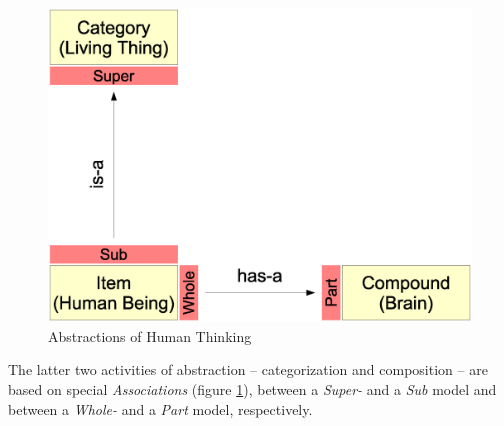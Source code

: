 \begin{figure}[ht]
    \begin{center}
        \includegraphics[scale=0.3]{vector/abstraction.eps}
        \caption{Abstractions of Human Thinking \cite{heller2004}}
        \label{abstraction_figure}
    \end{center}
\end{figure}

The latter two activities of abstraction -- categorization and composition --
are based on special \emph{Associations} (figure \ref{abstraction_figure}),
between a \emph{Super-} and a \emph{Sub} model and between a \emph{Whole-} and
a \emph{Part} model, respectively.
